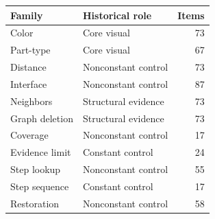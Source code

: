\begin{tabular}{@{}llr@{}}
\toprule
Family & Historical role & Items\\
\midrule
Color & Core visual & 73\\
Part-type & Core visual & 67\\
Distance & Nonconstant control & 73\\
Interface & Nonconstant control & 87\\
Neighbors & Structural evidence & 73\\
Graph deletion & Structural evidence & 73\\
Coverage & Nonconstant control & 17\\
Evidence limit & Constant control & 24\\
Step lookup & Nonconstant control & 55\\
Step sequence & Constant control & 17\\
Restoration & Nonconstant control & 58\\
\bottomrule
\end{tabular}
